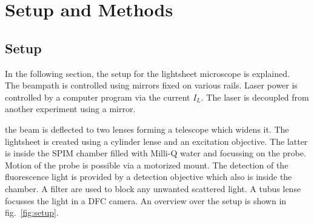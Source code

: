 

\def\skalierung{0.65}

\chapter{Setup and Methods}
\label{chap:methods}
\section{Setup}\label{sec:setup}
In the following section, the setup for the lightsheet microscope is explained. \\
The beampath is controlled using mirrors fixed on various rails. Laser power is controlled by a computer program via the current $I_L$. The laser is decoupled from another experiment using a mirror. 

 the beam is deflected to two lenses forming a telescope which widens it. The lightsheet is created using a cylinder lense and an excitation objective. The latter is inside the SPIM chamber filled with Milli-Q water and focussing on the probe. Motion of the probe is possible via a motorized mount. The detection of the fluorescence light is provided by a detection objective which also is inside the chamber. A filter are used to block any unwanted scattered light. A tubus lense focusses the light in a DFC camera. An overview over the setup is shown in fig.~\ref{fig:setup}.

